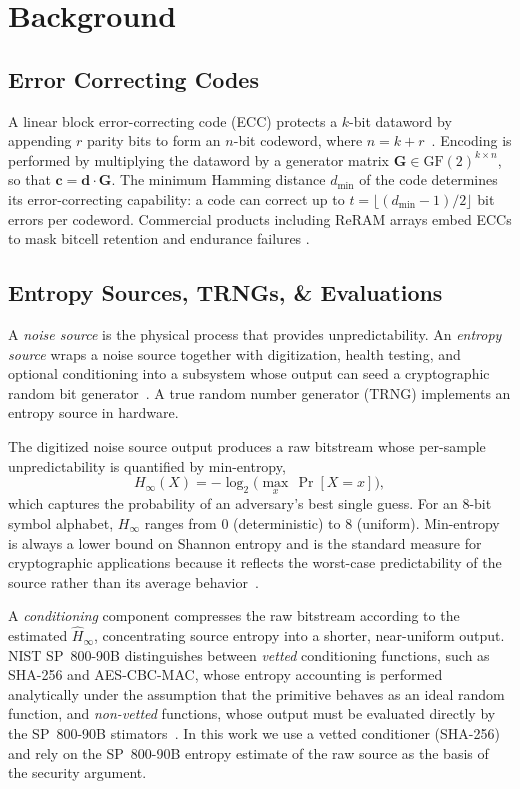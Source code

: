 \section{Background}

\subsection{Error Correcting Codes}
A linear block error-correcting code (ECC) protects a $k$-bit dataword by appending $r$ parity bits to form an $n$-bit codeword, where $n = k + r$~\cite{hamming1950error, sklar2004abcs}.  Encoding is performed by multiplying the dataword by a generator matrix $\mathbf{G} \in \mathrm{GF}(2)^{k \times n}$, so that $\mathbf{c} = \mathbf{d} \cdot \mathbf{G}$.  The minimum Hamming distance $d_{\min}$ of the code determines its error-correcting capability: a code can correct up to $t = \lfloor (d_{\min} - 1) / 2 \rfloor$ bit errors per codeword. Commercial products including ReRAM arrays embed ECCs to mask bitcell retention and endurance failures \cite{hayakawa2017resolving}.

\subsection{Entropy Sources, TRNGs, \& Evaluations}

A \emph{noise source} is the physical process that provides unpredictability.  An \emph{entropy source} wraps a noise source together with digitization, health testing, and optional conditioning into a subsystem whose output can seed a cryptographic random bit generator~\cite{sonmez2016recommendation}.  A true random number generator (TRNG) implements an entropy source in hardware.

The digitized noise source output produces a raw bitstream whose per-sample unpredictability is quantified by min-entropy,
%
\begin{equation}\label{eq:hmin}
  H_\infty(X) = -\log_2\!\bigl(\max_{x}\, \Pr[X = x]\bigr),
\end{equation}
%
which captures the probability of an adversary's best single guess.  For an 8-bit symbol alphabet, $H_\infty$ ranges from 0 (deterministic) to 8 (uniform).  Min-entropy is always a lower bound on Shannon entropy and is the standard measure for cryptographic applications because it reflects the worst-case predictability of the source rather than its average behavior~\cite{sonmez2016recommendation}.

A \emph{conditioning} component compresses the raw bitstream according to the estimated $\hat{H}_\infty$, concentrating source entropy into a shorter, near-uniform output.  NIST SP~800-90B distinguishes between \emph{vetted} conditioning functions, such as SHA-256 and AES-CBC-MAC, whose entropy accounting is performed analytically under the assumption that the primitive behaves as an ideal random function, and \emph{non-vetted} functions, whose output must be evaluated directly by the SP~800-90B stimators~\cite{sonmez2016recommendation}.  In this work we use a vetted conditioner (SHA-256) and rely on the SP~800-90B entropy estimate of the raw source as the basis of the security argument.

